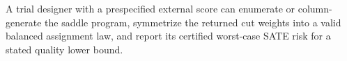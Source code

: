 A trial designer with a prespecified external score can enumerate or column-generate the saddle program, symmetrize the returned cut weights into a valid balanced assignment law, and report its certified worst-case SATE risk for a stated quality lower bound.
